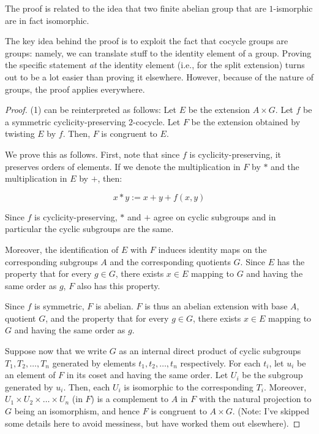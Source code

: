 \documentclass[10pt]{amsart}
\begin{document}
The proof is related to the idea that two finite abelian group that
are $1$-ismorphic are in fact isomorphic.

The key idea behind the proof is to exploit the fact that cocycle
groups are groups: namely, we can translate stuff to the identity
element of a group. Proving the specific statement {\em at} the
identity element (i.e., for the split extension) turns out to be a lot
easier than proving it elsewhere. However, because of the nature of
groups, the proof applies everywhere.

\begin{proof}
  (1) can be reinterpreted as follows: Let $E$ be the extension $A
  \times G$. Let $f$ be a symmetric cyclicity-preserving
  $2$-cocycle. Let $F$ be the extension obtained by twisting $E$ by
  $f$. Then, $F$ is congruent to $E$.

  We prove this as follows. First, note that since $f$ is
  cyclicity-preserving, it preserves orders of elements. If we denote
  the multiplication in $F$ by $*$ and the multiplication in $E$ by
  $+$, then:

  $$x * y := x + y + f(x,y)$$

  Since $f$ is cyclicity-preserving, $*$ and $+$ agree on cyclic
  subgroups and in particular the cyclic subgroups are the same.

  Moreover, the identification of $E$ with $F$ induces identity maps
  on the corresponding subgroups $A$ and the corresponding quotients
  $G$. Since $E$ has the property that for every $g \in G$, there
  exists $x \in E$ mapping to $G$ and having the same order as $g$,
  $F$ also has this property.

  Since $f$ is symmetric, $F$ is abelian. $F$ is thus an abelian
  extension with base $A$, quotient $G$, and the property that for
  every $g \in G$, there exists $x \in E$ mapping to $G$ and having
  the same order as $g$.

  Suppose now that we write $G$ as an internal direct product of
  cyclic subgroups $T_1, T_2, \dots, T_n$ generated by elements $t_1,
  t_2, \dots, t_n$ respectively. For each $t_i$, let $u_i$ be an
  element of $F$ in its coset and having the same order. Let $U_i$ be
  the subgroup generated by $u_i$. Then, each $U_i$ is isomorphic to
  the corresponding $T_i$. Moreover, $U_1 \times U_2 \times \dots
  \times U_n$ (in $F$) is a complement to $A$ in $F$ with the natural
  projection to $G$ being an isomorphism, and hence $F$ is congruent
  to $A \times G$. (Note: I've skipped some details here to avoid
  messiness, but have worked them out elsewhere).
\end{proof}
\end{document}
